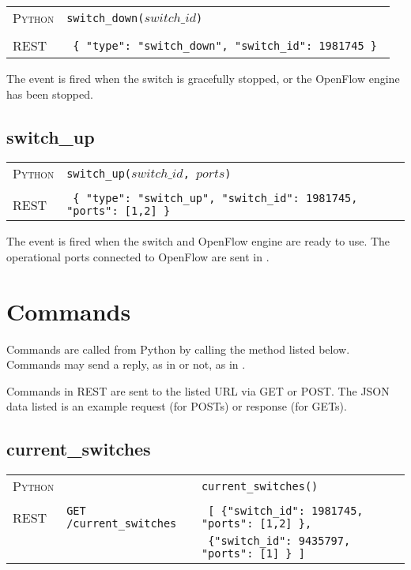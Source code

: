 \bigskip
\begin{tabularx}{\linewidth}{lX}
\textsc{Python}   & \texttt{switch\_down($switch\_id$)} \\ \\
\textsc{REST} & \texttt{ \{ "type": "switch\_down", "switch\_id": 1981745 \} } 
\end{tabularx}

The  event is fired when the switch is gracefully stopped, or the OpenFlow
engine has been stopped.  
 
\subsection{switch\_up}

\bigskip
\begin{tabularx}{\linewidth}{lX}
\textsc{Python}   & \texttt{switch\_up($switch\_id$, $ports$)} \\ \\
\textsc{REST} & \texttt{ \{ "type": "switch\_up", "switch\_id": 1981745, "ports": [1,2] \} } 
\end{tabularx}

The  event is fired when the switch and OpenFlow engine are ready to use.  The
operational ports connected to OpenFlow are sent in .  

\section{Commands}

Commands are called from Python by calling the method listed below.  Commands may send a reply, as in
 or not, as in .

Commands in REST are sent to the listed URL via GET or POST.  The JSON data listed is an example
request (for POSTs) or response (for GETs). 

\subsection{current\_switches}

\bigskip
\begin{tabularx}{\linewidth}{lXX}
\textsc{Python} &  & \texttt{current\_switches()} \\ \\
\textsc{REST} & \texttt{GET /current\_switches} & 
  \texttt{ [ \{"switch\_id": 1981745, "ports": [1,2] \}, } \\
  & & \texttt{ \{"switch\_id": 9435797, "ports": [1] \} ] } 
\end{tabularx}

